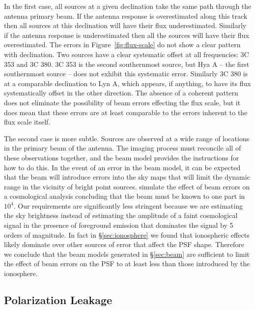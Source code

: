 \documentclass[twocolumn]{aastex61}
\begin{document}
In the first case, all sources at a given declination take the same path through the antenna primary
beam. If the antenna response is overestimated along this track then all sources at this declination
will have their flux underestimated. Similarly if the antenna response is underestimated then all
the sources will have their flux overestimated. The errors in Figure~\ref{fig:flux-scale} do not
show a clear pattern with declination. Two sources have a clear systematic offset at all
frequencies: 3C 353 and 3C 380. 3C 353 is the second southernmost source, but Hya A -- the first
southernmost source -- does not exhibit this systematic error. Similarly 3C 380 is at a comparable
declination to Lyn A, which appears, if anything, to have its flux systematically offset in the
other direction. The absence of a coherent pattern does not eliminate the possibility of beam errors
effecting the flux scale, but it does mean that these errors are at least comparable to the errors
inherent to the flux scale itself.

The second case is more subtle. Sources are observed at a wide range of locations in the primary
beam of the antenna. The imaging process must reconcile all of these observations together, and the
beam model provides the instructions for how to do this. In the event of an error in the beam model,
it can be expected that the beam will introduce errors into the sky maps that will limit the dynamic
range in the vicinity of bright point sources.  \citet{2015PhRvD..91h3514S} simulate the effect of
beam errors on a cosmological analysis concluding that the beam must be known to one part in $10^4$.
Our requirements are significantly less stringent because we are estimating the sky brightness
instead of estimating the amplitude of a faint cosmological signal in the presence of foreground
emission that dominates the signal by 5 orders of magnitude. In fact in \S\ref{sec:ionosphere} we
found that ionospheric effects likely dominate over other sources of error that affect the PSF
shape. Therefore we conclude that the beam models generated in \S\ref{sec:beam} are sufficient to
limit the effect of beam errors on the PSF to at least less than those introduced by the ionosphere.

\subsection{Polarization Leakage}
\end{document}
